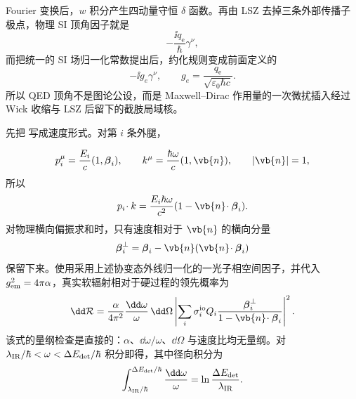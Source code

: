 \begin{derivation}[高斯平均中的传播子与顶角规则]
Fourier 变换后，$w$ 积分产生四动量守恒 \(\delta\) 函数。再由 LSZ 去掉三条外部传播子极点，物理 SI 顶角因子就是
\begin{equation*}
 -\frac{\ii q_{\mathrm e}}{\hbar}\gamma^\nu,
 \end{equation*}
而把统一的 SI 场归一化常数提出后，约化规则变成前面定义的
\begin{equation*}
 {-\ii g_e\gamma^\nu,\qquad
 g_e=\frac{q_{\mathrm e}}{\sqrt{\varepsilon_0\hbar c}}.}
 \end{equation*}
所以 QED 顶角不是图论公设，而是 Maxwell--Dirac 作用量的一次微扰插入经过 Wick 收缩与 LSZ 后留下的截肢局域核。
\end{derivation}

\begin{derivation}[软光子因子的角分布]
先把 写成速度形式。对第 $i$ 条外腿，

\begin{equation*}
 p_i^\mu=\frac{E_i}{c}(1,\boldsymbol\beta_i),
 \qquad
 k^\mu=\frac{\hbar\omega}{c}(1,\vb{n}),
 \qquad
 |\vb{n}|=1,
\end{equation*}
所以
\begin{equation*}
 p_i\!\cdot k
 =\frac{E_i \hbar\omega}{c^2}
 (1-\vb{n}\!\cdot\boldsymbol\beta_i).
\end{equation*}
对物理横向偏振求和时，只有速度相对于 $\vb{n}$ 的横向分量
\begin{equation*}
 \boldsymbol\beta_i^\perp
 =\boldsymbol\beta_i-\vb{n}(\vb{n}\!\cdot\boldsymbol\beta_i)
\end{equation*}
保留下来。使用采用上述协变态外线归一化的一光子相空间因子，并代入 $g_{\rm em}^2=4\pi\alpha$，真实软辐射相对于硬过程的领先概率为
\begin{equation*}
 \dd\mathcal R
 =\frac{\alpha}{4\pi^2}
 \frac{\dd\omega}{\omega}\,\dd\Omega
 \left|
 \sum_i\sigma_i^{\rm io}Q_i
 \frac{\boldsymbol\beta_i^\perp}
 {1-\vb{n}\!\cdot\boldsymbol\beta_i}
 \right|^2.
\end{equation*}
该式的量纲检查是直接的：$\alpha$、$\dd\omega/\omega$、$\dd\Omega$ 与速度比均无量纲。对
$\lambda_{\rm IR}/\hbar<\omega<\Delta E_{\rm det}/\hbar$ 积分即得，其中径向积分为
\begin{equation*}
 \int_{\lambda_{\rm IR}/\hbar}^{\Delta E_{\rm det}/\hbar}
 \frac{\dd\omega}{\omega}
 =\ln\frac{\Delta E_{\rm det}}{\lambda_{\rm IR}}.
\end{equation*}
\end{derivation}

